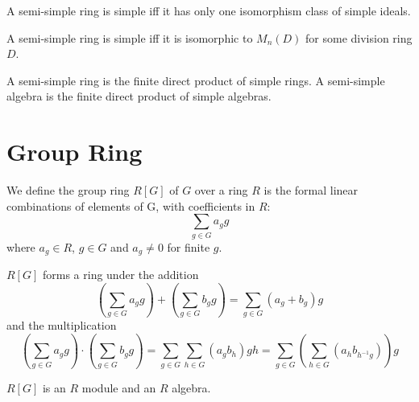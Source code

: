 \documentclass[12pt]{book}
\begin{document}
	\begin{corollary}
		A semi-simple ring is simple iff it has only one isomorphism class of simple ideals.
	\end{corollary}
	
	\begin{corollary}
		A semi-simple ring is simple iff it is isomorphic to $M_n(D)$ for some division ring $D$.
	\end{corollary}
	
	\begin{corollary}
		A semi-simple ring is the finite direct product of simple rings. A semi-simple algebra is the finite direct product of simple algebras.
	\end{corollary}
	
	\section{Group Ring}
	
	\begin{definition}
		We define the group ring $R[G]$ of $G$ over a ring $R$ is the formal linear combinations of elements of G, with coefficients in $R$:
		\begin{equation}
			\sum_{g\in G} a_g g
		\end{equation}
		where $a_g\in R$, $g\in G$ and $a_g\neq 0$ for finite $g$.
	\end{definition}
	
	$R[G]$ forms a ring under the addition
	\begin{equation}
		(\sum_{g\in G} a_g g)+(\sum_{g\in G} b_g g)=\sum_{g\in G} (a_g+b_g)g
	\end{equation}
	and the multiplication
	\begin{equation}
		(\sum_{g\in G} a_g g)\cdot(\sum_{g\in G} b_g g)=\sum_{g\in G}\sum_{h\in G} (a_gb_h)gh=\sum_{g\in G} (\sum_{h\in G} (a_hb_{h^{-1}g})) g 
	\end{equation}
	
	$R[G]$ is an $R$ module and an $R$ algebra.
	
\end{document}
